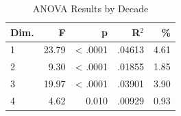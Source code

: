 \begin{table}[H]
  \centering
  \caption{ANOVA Results by Decade}
  \label{tab:anova_decade}
  \begin{tabular}{l r r r r}
    Dim. & F & p & R$^2$ & \% \\
    \hline
    1 & 23.79 & < .0001 & .04613 & 4.61 \\
    2 & 9.30 & < .0001 & .01855 & 1.85 \\
    3 & 19.97 & < .0001 & .03901 & 3.90 \\
    4 & 4.62 & 0.010 & .00929 & 0.93 \\
  \end{tabular}
\end{table}
